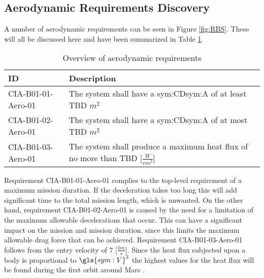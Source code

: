 \subsection{Aerodynamic Requirements Discovery} 
\label{sec:aero}
A number of aerodynamic requirements can be seen in Figure \ref{fig:RBS}. These will all be discussed here and have been summarized in Table \ref{tab:aeroreqs}. 


\begin{table}[h]
	\caption{Overview of aerodynamic requirements}
	\label{tab:aeroreqs}
	\begin{tabular}{|p{}|p{}|}
		\hline
		ID & Description \\
		\hline \hline
		CIA-B01-01-Aero-01 & The system shall have a \gls{sym:CD}\gls{sym:A} of at least TBD $m^{2}$ \\ \hline
		CIA-B01-02-Aero-01 & The system shall have a \gls{sym:CD}\gls{sym:A} of at most TBD $m^{2}$ \\ \hline
		CIA-B01-03-Aero-01 & The system shall produce a maximum heat flux of no more than TBD [$\frac{W}{cm^{2}}$] \\ \hline
	\end{tabular}
\end{table}
Requirement CIA-B01-01-Aero-01 complies to the top-level requirement of a maximum mission duration. If the deceleration takes too long this will add significant time to the total mission length, which is unwanted.
On the other hand, requirement CIA-B01-02-Aero-01 is caused by the need for a limitation of the maximum allowable decelerations that occur. This can have a significant impact on the mission and mission duration, since this limits the maximum allowable drag force that can be achieved.
Requirement CIA-B01-03-Aero-01 follows from the entry velocity of 7 [$\frac{km}{s}$]. Since the heat flux subjected upon a body is proportional to $\gls{sym:V}^{3}$ the highest values for the heat flux will be found during the first orbit around Mars \cite{Tauber1986}.